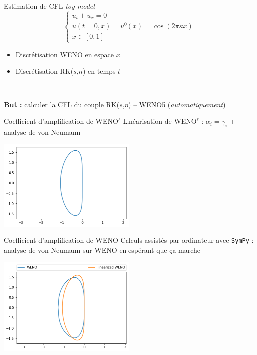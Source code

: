 \documentclass{beamer}
\begin{document}
\begin{frame}{Estimation de CFL}
  \emph{toy model} $$\begin{cases}u_t + u_x = 0 \\ u(t=0,x) = u^0(x) = \cos({2\pi\kappa x}) \\ x\in [0,1] \end{cases}$$
  \begin{itemize}
    \item Discrétisation WENO en espace $x$
    \item Discrétisation RK($s$,$n$) en temps $t$
  \end{itemize}

  \ 

  \textbf{But :} calculer la CFL du couple RK($s$,$n$) -- WENO5 (\emph{automatiquement})
\end{frame}

\begin{frame}{Coefficient d'amplification de WENO$^\ell$}
  Linéarisation de WENO$^\ell$ : $\alpha_i = \gamma_i$ + analyse de von Neumann

  \begin{center}
    \includegraphics[width=0.5\textwidth]{wenol.png}
  \end{center}
\end{frame}

\begin{frame}{Coefficient d'amplification de WENO}
  Calculs assistés par ordinateur avec \texttt{SymPy} : analyse de von Neumann sur WENO en espérant que ça marche
  
  \begin{center}
    \includegraphics[width=0.5\textwidth]{weno.png}
  \end{center}
\end{frame}
\end{document}
